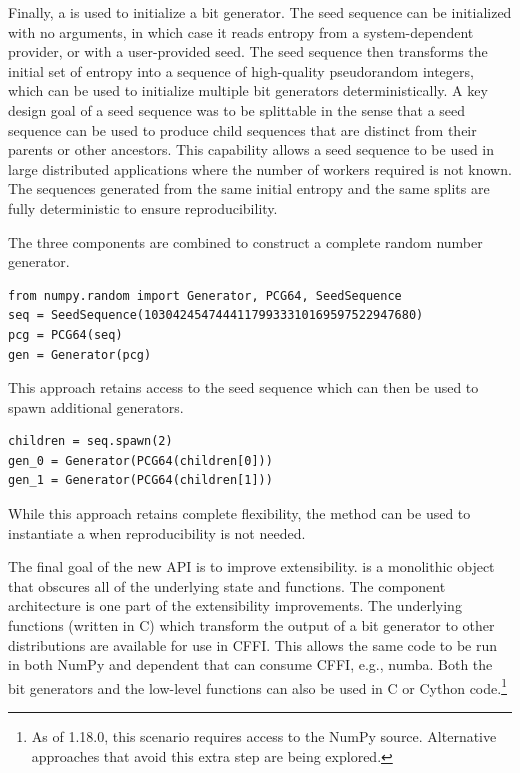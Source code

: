 Finally, a  is used to initialize a bit generator. The seed
sequence can be initialized with no arguments, in which case it reads entropy
from a system-dependent provider, or with a user-provided seed. The seed
sequence then transforms the initial set of entropy into a sequence of
high-quality pseudorandom integers, which can be used to initialize multiple bit
generators deterministically. A key design goal of a seed sequence was to be
splittable in the sense that a seed sequence can be used to produce child
sequences that are distinct from their parents or other ancestors. This
capability allows a seed sequence to be used in large distributed applications
where the number of workers required is not known. The sequences generated from
the same initial entropy and the same splits are fully deterministic to ensure
reproducibility.

The three components are combined to construct a complete random number
generator.

\begin{lstlisting}
from numpy.random import Generator, PCG64, SeedSequence
seq = SeedSequence(10304245474441179933310169597522947680)
pcg = PCG64(seq)
gen = Generator(pcg)
\end{lstlisting}

\noindent This approach retains access to the seed sequence which can then be
used to spawn additional generators.

\begin{lstlisting}
children = seq.spawn(2)
gen_0 = Generator(PCG64(children[0]))
gen_1 = Generator(PCG64(children[1]))
\end{lstlisting}

\noindent While this approach retains complete flexibility, the method
 can be used to instantiate a  when
reproducibility is not needed.

The final goal of the new API is to improve extensibility.  is
a monolithic object that obscures all of the underlying state and functions. The
component architecture is one part of the extensibility improvements. The
underlying functions (written in C) which transform the output of a bit
generator to other distributions are available for use in CFFI. This allows the
same code to be run in both NumPy and dependent that can consume CFFI, e.g.,
numba. Both the bit generators and the low-level functions can also be used in C
or Cython code.\footnote{As of 1.18.0, this scenario requires access to the
NumPy source. Alternative approaches that avoid this extra step are being
explored.} 

